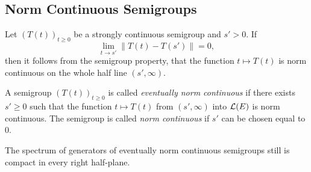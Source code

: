 \subsection{Norm Continuous Semigroups} \label{subsec:a2-1.se6}%
Let $(T(t))_{t\geq 0}$ be a strongly continuous semigroup and $s' > 0$.
If\/ 
%
\[
	\lim_{t \to s'} \|T(t) - T(s')\| = 0 ,
\]
%
then it follows from the semigroup property, that the function $t \mapsto T(t)$ is norm continuous on the whole half line $(s',\infty)$.

\begin{definition}\label{def:a2-1.19}
A semigroup $(T(t))_{t\geq 0}$ is called \emph{eventually norm continuous} if there exists $s' \geq 0$ such that the function $t \mapsto T(t)$ from $(s',\infty)$ into $\mathcal{L}(E)$ is norm continuous.
The semigroup is called \emph{norm continuous} if\/ $s'$ can be chosen equal to $0$.
\end{definition}

The spectrum of generators of eventually norm continuous semigroups still is compact in every right half-plane.

